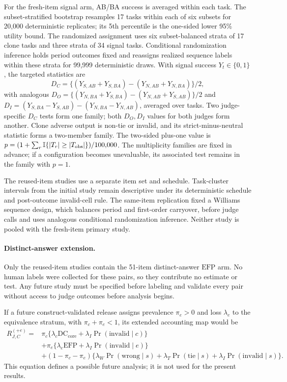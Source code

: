 \documentclass[10pt]{article}
\newcommand{\DCcore}{\ensuremath{\mathrm{DC}_{\mathrm{core}}}}
\newcommand{\EFP}{\ensuremath{\mathrm{EFP}}}
\newcommand{\ind}{\mathbb{I}}
\begin{document}
For the fresh-item signal arm, AB/BA success is averaged within each task. The subset-stratified bootstrap resamples 17 tasks within each of six subsets for 20{,}000 deterministic replicates; its 5th percentile is the one-sided lower 95\% utility bound. The randomized assignment uses six subset-balanced strata of 17 clone tasks and three strata of 34 signal tasks. Conditional randomization inference holds period outcomes fixed and reassigns realized sequence labels within these strata for 99{,}999 deterministic draws. With signal success $Y_t\in\{0,1\}$, the targeted statistics are
\[
D_C=\{(Y_{S,AB}+Y_{S,BA})-(Y_{N,AB}+Y_{N,BA})\}/2,
\]
with analogous $D_O=\{(Y_{N,BA}+Y_{S,BA})-(Y_{N,AB}+Y_{S,AB})\}/2$ and $D_I=(Y_{S,BA}-Y_{S,AB})-(Y_{N,BA}-Y_{N,AB})$, averaged over tasks. Two judge-specific $D_C$ tests form one family; both $D_O,D_I$ values for both judges form another. Clone adverse output is non-tie or invalid, and its strict-minus-neutral statistic forms a two-member family. The two-sided plus-one value is $p=(1+\sum_r\ind\{|T_r|\geq|T_{\rm obs}|\})/100{,}000$. The multiplicity families are fixed in advance; if a configuration becomes unevaluable, its associated test remains in the family with $p=1$.

The reused-item studies use a separate item set and schedule. Task-cluster intervals from the initial study remain descriptive under its deterministic schedule and post-outcome invalid-cell rule. The same-item replication fixed a Williams sequence design, which balances period and first-order carryover, before judge calls and uses analogous conditional randomization inference. Neither study is pooled with the fresh-item primary study.

\paragraph{Distinct-answer extension.}
Only the reused-item studies contain the 51-item distinct-answer \EFP{} arm. No human labels were collected for these pairs, so they contribute no estimate or test. Any future study must be specified before labeling and validate every pair without access to judge outcomes before analysis begins.

If a future construct-validated release assigns prevalence $\pi_e>0$ and loss $\lambda_e$ to the equivalence stratum, with $\pi_c+\pi_e<1$, its extended accounting map would be
\[
\begin{split}
R^{(+e)}_{J,C}={}&\pi_c\{\lambda_c\DCcore+\lambda_I\Pr(\mathrm{invalid}\mid c)\}\\
&+\pi_e\{\lambda_e\EFP+\lambda_I\Pr(\mathrm{invalid}\mid e)\}\\
&+(1-\pi_c-\pi_e)\{\lambda_W\Pr(\mathrm{wrong}\mid s)
+\lambda_T\Pr(\mathrm{tie}\mid s)+\lambda_I\Pr(\mathrm{invalid}\mid s)\}.
\end{split}
\]
This equation defines a possible future analysis; it is not used for the present results.
\end{document}
